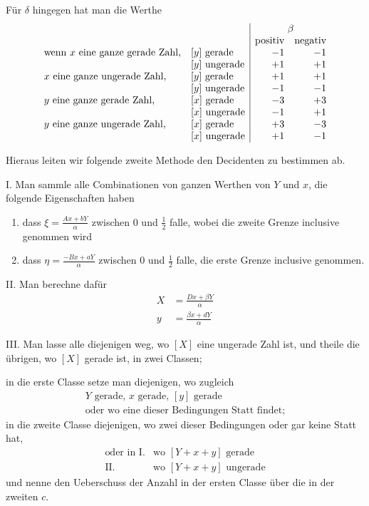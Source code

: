 Für $\delta$ hingegen hat man die Werthe
\[
\begin{array}{ll|rr}
&&\multicolumn{2}{c}{\beta}\\
&&\text{positiv}&\text{negativ}\\
\text{wenn }x\text{ eine ganze gerade Zahl,}&[y]\text{ gerade}&-1&-1\\
&[y]\text{ ungerade}&+1&+1\\
x\text{ eine ganze ungerade Zahl,}&[y]\text{ gerade}&+1&+1\\
&[y]\text{ ungerade}&-1&-1\\
y\text{ eine ganze gerade Zahl,}&[x]\text{ gerade}&-3&+3\\
&[x]\text{ ungerade}&-1&+1\\
y\text{ eine ganze ungerade Zahl,}&[x]\text{ gerade}&+3&-3\\
&[x]\text{ ungerade}&+1&-1
\end{array}
\]

Hieraus leiten wir folgende zweite Methode den Decidenten zu bestimmen ab.

I. Man sammle alle Combinationen von ganzen Werthen von $Y$ und $x$, die folgende Eigenschaften haben
\begin{enumerate}
\item dass $\xi=\frac{Ax+bY}{\alpha}$ zwischen $0$ und $\frac12$ falle, wobei die zweite Grenze inclusive genommen wird
\item dass $\eta=\frac{-Bx+aY}{\alpha}$ zwischen $0$ und $\frac12$ falle, die erste Grenze inclusive genommen.
\end{enumerate}

II. Man berechne dafür
\[
\begin{aligned}
X&=\frac{Dx+\beta Y}{\alpha}\\[3pt]
y&=\frac{\beta x+dY}{\alpha}
\end{aligned}
\]

III. Man lasse alle diejenigen weg, wo $[X]$ eine ungerade Zahl ist, und theile die übrigen, wo $[X]$ gerade ist, in zwei Classen;

in die erste Classe setze man diejenigen, wo zugleich
\[
\begin{array}{l}
Y\text{ gerade, }x\text{ gerade, }[y]\text{ gerade}\\
\text{oder wo eine dieser Bedingungen Statt findet;}
\end{array}
\]
in die zweite Classe diejenigen, wo zwei dieser Bedingungen oder gar keine Statt hat,
\[
\begin{array}{rl}
\text{oder in I.}&\text{wo }[Y+x+y]\text{ gerade}\\
\text{II.}&\text{wo }[Y+x+y]\text{ ungerade}
\end{array}
\]
und nenne den Ueberschuss der Anzahl in der ersten Classe über die in der zweiten $c$.

